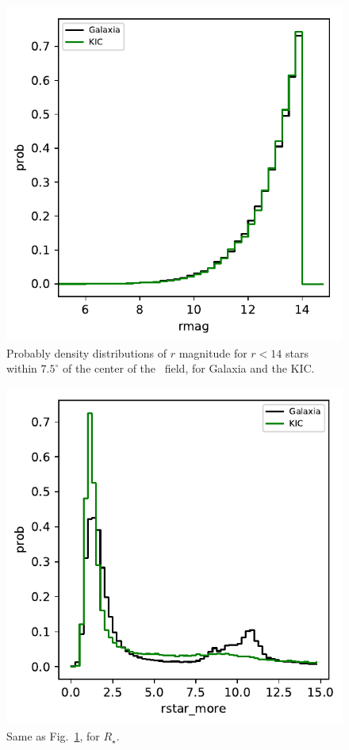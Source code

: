 \documentclass{emulateapj}
\begin{document}
\begin{figure}[!t]
	\begin{center}
		\includegraphics[scale=.8]{figures/rmag_distribn.pdf}
	\end{center}
	\caption{Probably density distributions of $r$ magnitude for $r<14$ stars 
	within $7.5^\circ$ of the center of the \kepler\ field, for Galaxia and the 
	KIC.	}
	\label{fig:rmag_distribn}
\end{figure}
\begin{figure}[!t]
	\begin{center}
		\includegraphics[scale=.8]{figures/rstar_more_distribn.pdf}
	\end{center}
	\caption{Same as Fig.~\ref{fig:rmag_distribn}, for $R_\star$.}
	\label{fig:rstar_more_distribn}
\end{figure}
\end{document}
